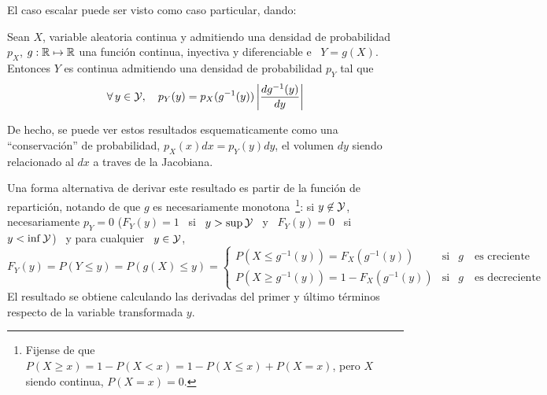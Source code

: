 El caso escalar puede ser visto como caso particular, dando:
%
\begin{corolario}
  Sean  $X$,   variable  aleatoria  continua   y  admitiendo  una   densidad  de
  probabilidad $p_X$, $g:\mathbb{R} \mapsto  \mathbb{R}$ una funci\'on continua, inyectiva
  y  diferenciable e  \ $Y  = g(X)$.   Entonces $Y$  es continua  admitiendo una
  densidad de probabilidad $p_Y$ tal que
  \[
  \forall  \,   y  \in  \mathcal{Y},   \quad  p_Y(y)  =  p_X(g^{-1}(y))   \left|  \frac{d
      g^{-1}(y)}{dy} \right|
  \]
\end{corolario}
%
\noindent  De hecho,  se puede  ver estos  resultados esquematicamente  como una
``conservaci\'on'' de  probabilidad, $p_X(x)  dx = p_Y(y)  dy$, el  volumen $dy$
siendo relacionado al $dx$ a traves de la Jacobiana.

Una forma  alternativa de derivar  este resultado es  partir de la  funci\'on de
repartici\'on, notando  de que $g$  es necesariamente monotona~\footnote{Fijense
  de que  $P(X \ge x) =  1 - P(X <  x) = 1  - P(X \le x)  + P(X = x)$,  pero $X$
  siendo continua, $ P(X  = x) = 0$.}: si $y \not\in  \mathcal{Y}$, necesariamente $p_Y =
0$ ($F_Y(y) = 1$ \ si \ $y > \sup \mathcal{Y}$ \ y \ $F_Y(y) = 0$ \ si \ $y < \inf \mathcal{Y}$) \
y para cualquier \ $y \in \mathcal{Y}$,
%
\[
F_Y(y) = P(Y \le y) = P(g(X) \le y) =
\left\{\begin{array}{lll}
P(X \le g^{-1}(y)) = F_X(g^{-1}(y)) & \mbox{si} & g \quad \mbox{es creciente}\\[2.5mm]
%
P(X \ge g^{-1}(y)) = 1 - F_X(g^{-1}(y)) & \mbox{si} & g \quad \mbox{es decreciente}
\end{array}\right.
\]
%
El  resultado  se  obtiene  calculando  las  derivadas  del  primer  y  \'ultimo
t\'erminos respecto de la variable transformada $y$.


